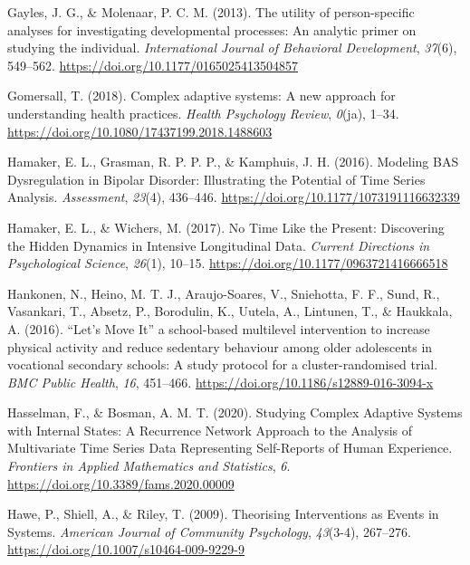 \documentclass[
  british,
  man,floatsintext]{apa6}
\begin{document}
\leavevmode\hypertarget{ref-gaylesUtilityPersonspecificAnalyses2013}{}%
Gayles, J. G., \& Molenaar, P. C. M. (2013). The utility of person-specific analyses for investigating developmental processes: An analytic primer on studying the individual. \emph{International Journal of Behavioral Development}, \emph{37}(6), 549--562. \url{https://doi.org/10.1177/0165025413504857}

\leavevmode\hypertarget{ref-gomersallComplexAdaptiveSystems2018}{}%
Gomersall, T. (2018). Complex adaptive systems: A new approach for understanding health practices. \emph{Health Psychology Review}, \emph{0}(ja), 1--34. \url{https://doi.org/10.1080/17437199.2018.1488603}

\leavevmode\hypertarget{ref-hamakerModelingBASDysregulation2016}{}%
Hamaker, E. L., Grasman, R. P. P. P., \& Kamphuis, J. H. (2016). Modeling BAS Dysregulation in Bipolar Disorder: Illustrating the Potential of Time Series Analysis. \emph{Assessment}, \emph{23}(4), 436--446. \url{https://doi.org/10.1177/1073191116632339}

\leavevmode\hypertarget{ref-hamakerNoTimePresent2017}{}%
Hamaker, E. L., \& Wichers, M. (2017). No Time Like the Present: Discovering the Hidden Dynamics in Intensive Longitudinal Data. \emph{Current Directions in Psychological Science}, \emph{26}(1), 10--15. \url{https://doi.org/10.1177/0963721416666518}

\leavevmode\hypertarget{ref-hankonenLetMoveIt2016}{}%
Hankonen, N., Heino, M. T. J., Araujo-Soares, V., Sniehotta, F. F., Sund, R., Vasankari, T., Absetz, P., Borodulin, K., Uutela, A., Lintunen, T., \& Haukkala, A. (2016). ``Let's Move It'' a school-based multilevel intervention to increase physical activity and reduce sedentary behaviour among older adolescents in vocational secondary schools: A study protocol for a cluster-randomised trial. \emph{BMC Public Health}, \emph{16}, 451--466. \url{https://doi.org/10.1186/s12889-016-3094-x}

\leavevmode\hypertarget{ref-hasselmanStudyingComplexAdaptive2020}{}%
Hasselman, F., \& Bosman, A. M. T. (2020). Studying Complex Adaptive Systems with Internal States: A Recurrence Network Approach to the Analysis of Multivariate Time Series Data Representing Self-Reports of Human Experience. \emph{Frontiers in Applied Mathematics and Statistics}, \emph{6}. \url{https://doi.org/10.3389/fams.2020.00009}

\leavevmode\hypertarget{ref-haweTheorisingInterventionsEvents2009}{}%
Hawe, P., Shiell, A., \& Riley, T. (2009). Theorising Interventions as Events in Systems. \emph{American Journal of Community Psychology}, \emph{43}(3-4), 267--276. \url{https://doi.org/10.1007/s10464-009-9229-9}
\end{document}
